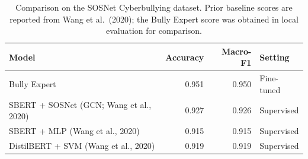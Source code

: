 
\begin{table}[htbp]
\centering
\caption{Comparison on the SOSNet Cyberbullying dataset. Prior baseline scores are reported from Wang et al.\ (2020); the Bully Expert score was obtained in local evaluation for comparison.}
\label{tab:sosnet-benchmark-comparison}
\small
\begin{tabular}{p{6.6cm} r r p{2.0cm}}
\toprule
Model & Accuracy & Macro-F1 & Setting \\
\midrule
Bully Expert & 0.951 & 0.950 & Fine-tuned \\
SBERT + SOSNet (GCN; Wang et al., 2020) & 0.927 & 0.926 & Supervised \\
SBERT + MLP (Wang et al., 2020) & 0.915 & 0.915 & Supervised \\
DistilBERT + SVM (Wang et al., 2020) & 0.919 & 0.919 & Supervised \\
\bottomrule
\end{tabular}
\end{table}
